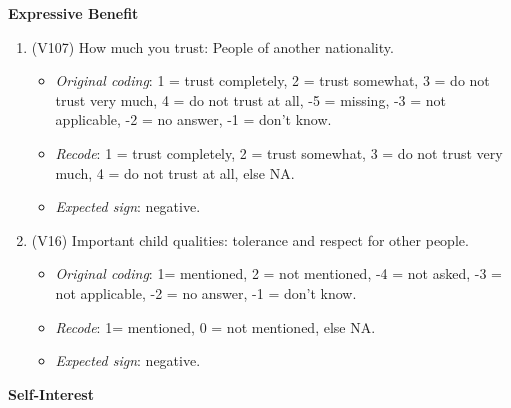 \documentclass[]{article}
\begin{document}
\textbf{Expressive Benefit}

\begin{enumerate}
  \item (V107) How much you trust: People of another nationality.
  \begin{itemize}
  \item \textit{Original coding}: 1 = trust completely, 2 = trust somewhat, 3 = do not trust very much, 4 = do not trust at all, -5 = missing, -3 = not applicable, -2 = no answer, -1 = don't know.
  \item \textit{Recode}: 1 = trust completely, 2 = trust somewhat, 3 = do not trust very much, 4 = do not trust at all, else NA.
  \item \textit{Expected sign}: negative.
  \end{itemize}
  \item (V16) Important child qualities: tolerance and respect for other people.
  \begin{itemize}
  \item \textit{Original coding}: 1= mentioned, 2 = not mentioned, -4 = not asked, -3 = not applicable, -2 = no answer, -1 = don't know.
  \item \textit{Recode}: 1= mentioned, 0 = not mentioned, else NA.
  \item \textit{Expected sign}: negative.
  \end{itemize}
\end{enumerate}

\textbf{Self-Interest}
\end{document}
